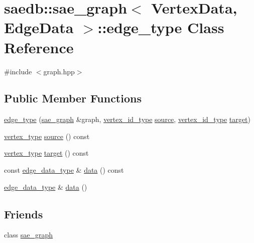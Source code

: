 \hypertarget{classsaedb_1_1sae__graph_1_1edge__type}{\section{saedb\-:\-:sae\-\_\-graph$<$ Vertex\-Data, Edge\-Data $>$\-:\-:edge\-\_\-type Class Reference}
\label{d0/db8/classsaedb_1_1sae__graph_1_1edge__type}
}


{\ttfamily \#include $<$graph.\-hpp$>$}

\subsection*{Public Member Functions}
\begin{DoxyCompactItemize}
\item 
\hyperlink{classsaedb_1_1sae__graph_1_1edge__type_acaa0dd02d5b3dbb56ce5b2c3ca794729}{edge\-\_\-type} (\hyperlink{classsaedb_1_1sae__graph}{sae\-\_\-graph} \&graph, \hyperlink{classsaedb_1_1sae__graph_a2f9a7bf2db556689f1cd9de9562ff41f}{vertex\-\_\-id\-\_\-type} \hyperlink{classsaedb_1_1sae__graph_1_1edge__type_a4390045184b064ece8fd26f2ebe207ba}{source}, \hyperlink{classsaedb_1_1sae__graph_a2f9a7bf2db556689f1cd9de9562ff41f}{vertex\-\_\-id\-\_\-type} \hyperlink{classsaedb_1_1sae__graph_1_1edge__type_a40661cb51a17d5619027b65cd5ac3366}{target})
\item 
\hyperlink{structsaedb_1_1sae__graph_1_1vertex__type}{vertex\-\_\-type} \hyperlink{classsaedb_1_1sae__graph_1_1edge__type_a4390045184b064ece8fd26f2ebe207ba}{source} () const 
\item 
\hyperlink{structsaedb_1_1sae__graph_1_1vertex__type}{vertex\-\_\-type} \hyperlink{classsaedb_1_1sae__graph_1_1edge__type_a40661cb51a17d5619027b65cd5ac3366}{target} () const 
\item 
const \hyperlink{classsaedb_1_1sae__graph_a3f786e0be3d855a988333235a6b50d02}{edge\-\_\-data\-\_\-type} \& \hyperlink{classsaedb_1_1sae__graph_1_1edge__type_a9345a4e7ac1bf94fb99e3211c9174158}{data} () const 
\item 
\hyperlink{classsaedb_1_1sae__graph_a3f786e0be3d855a988333235a6b50d02}{edge\-\_\-data\-\_\-type} \& \hyperlink{classsaedb_1_1sae__graph_1_1edge__type_ac60463be0805bb8b213150685b80aa6c}{data} ()
\end{DoxyCompactItemize}
\subsection*{Friends}
\begin{DoxyCompactItemize}
\item 
class \hyperlink{classsaedb_1_1sae__graph_1_1edge__type_a97750ab4596baa220f15914e38e3543b}{sae\-\_\-graph}
\end{DoxyCompactItemize}


